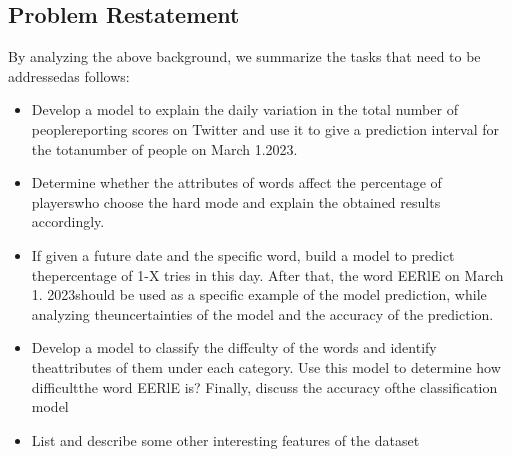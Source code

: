 \documentclass[12pt]{ctexart}
\newcommand{\upcite}[1]{\textsuperscript{\textsuperscript{\cite{#1}}}}%
\begin{document}
\subsection{Problem Restatement} %
By analyzing the above background, we summarize the tasks that need to be addressedas follows:
\begin{itemize}
	\item Develop a model to explain the daily variation in the total number of peoplereporting scores on Twitter and use it to give a prediction interval for the totanumber of people on March 1.2023.
	\item Determine whether the attributes of words affect the percentage of playerswho choose the hard mode and explain the obtained results accordingly.
	\item If given a future date and the specific word, build a model to predict thepercentage of 1-X tries in this day. After that, the word EERlE on March 1. 2023should be used as a specific example of the model prediction, while analyzing theuncertainties of the model and the accuracy of the prediction.
	\item Develop a model to classify the diffculty of the words and identify theattributes of them under each category. Use this model to determine how difficultthe word EERlE is? Finally, discuss the accuracy ofthe classification model
	\item List and describe some other interesting features of the dataset
\end{itemize}
\end{document}
